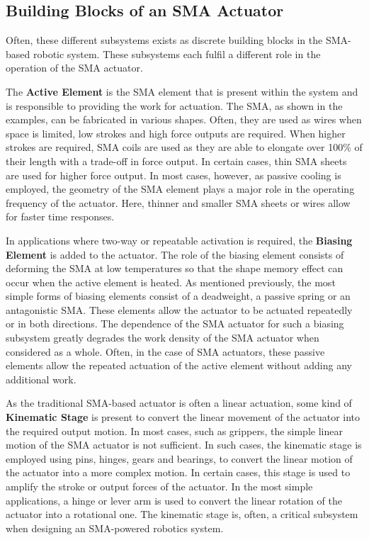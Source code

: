 \subsection{Building Blocks of an SMA Actuator}
Often, these different subsystems exists as discrete building blocks in the SMA-based robotic system. These subsystems each fulfil a different role in the operation of the SMA actuator.

The \textbf{Active Element} is the SMA element that is present within the system and is responsible to providing the work for actuation. The SMA, as shown in the examples, can be fabricated in various shapes. Often, they are used as wires when space is limited, low strokes and high force outputs are required. When higher strokes are required, SMA coils are used as they are able to elongate over 100\% of their length with a trade-off in force output. In certain cases, thin SMA sheets are used for higher force output. In most cases, however, as passive cooling is employed, the geometry of the SMA element plays a major role in the operating frequency of the actuator. Here, thinner and smaller SMA sheets or wires allow for faster time responses.

In applications where two-way or repeatable activation is required, the \textbf{Biasing Element} is added to the actuator. The role of the biasing element consists of deforming the SMA at low temperatures so that the shape memory effect can occur when the active element is heated. As mentioned previously, the most simple forms of biasing elements consist of a deadweight, a passive spring or an antagonistic SMA. These elements allow the actuator to be actuated repeatedly or in both directions. The dependence of the SMA actuator for such a biasing subsystem greatly degrades the work density of the SMA actuator when considered as a whole. Often, in the case of SMA actuators, these passive elements allow the repeated actuation of the active element without adding any additional work.

As the traditional SMA-based actuator is often a linear actuation, some kind of \textbf{Kinematic Stage} is present to convert the linear movement of the actuator into the required output motion. In most cases, such as grippers, the simple linear motion of the SMA actuator is not sufficient. In such cases, the kinematic stage is employed using pins, hinges, gears and bearings, to convert the linear motion of the actuator into a more complex motion. In certain cases, this stage is used to amplify the stroke or output forces of the actuator. In the most simple applications, a hinge or lever arm is used to convert the linear rotation of the actuator into a rotational one. The kinematic stage is, often, a critical subsystem when designing an SMA-powered robotics system.

